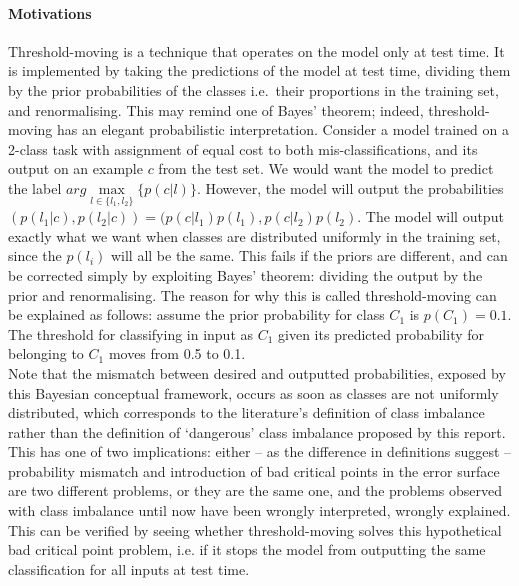 \documentclass[a4paper,11pt]{article}
\begin{document}
\paragraph{Motivations}
Threshold-moving is a technique that operates on the model only at test time. It is implemented by taking the predictions of the model at test time, dividing them by the prior probabilities of the classes i.e.\ their proportions in the training set, and renormalising. This may remind one of Bayes' theorem; indeed, threshold-moving has an elegant probabilistic interpretation. Consider a model trained on a 2-class task with assignment of equal cost to both mis-classifications, and its output on an example $c$ from the test set. We would want the model to predict the label $arg\max\limits_{l \in \{l_1,l_2\}} \{p(c | l)\}$. However, the model will output the probabilities $(p(l_1 | c), p(l_2 | c)) = (p(c | l_1) p(l_1), p(c | l_2) p(l_2)$.
The model will output exactly what we want when classes are distributed uniformly in the training set, since the $p(l_i)$ will all be the same. This fails if the priors are different, and can be corrected simply by exploiting Bayes' theorem: dividing the output by the prior and renormalising. The reason for why this is called threshold-moving can be explained as follows: assume the prior probability for class $C_1$ is $p(C_1)=0.1$. The threshold for classifying in input as $C_1$ given its predicted probability for belonging to $C_1$ moves from 0.5 to 0.1. \\

Note that the mismatch between desired and outputted probabilities, exposed by this Bayesian conceptual framework, occurs as soon as classes are not uniformly distributed, which corresponds to the literature's definition of class imbalance rather than the definition of `dangerous' class imbalance proposed by this report. This has one of two implications: either -- as the difference in definitions suggest -- probability mismatch and introduction of bad critical points in the error surface are two different problems, or they are the same one, and the problems observed with class imbalance until now have been wrongly interpreted, wrongly explained. This can be verified by seeing whether threshold-moving solves this hypothetical bad critical point problem, i.e. if it stops the model from outputting the same classification for all inputs at test time. \\
\end{document}

